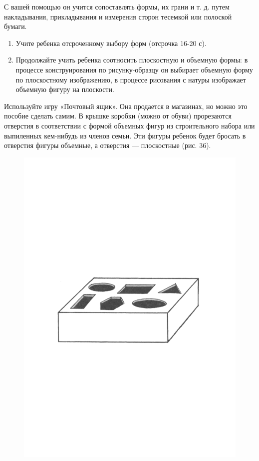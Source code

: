 \documentclass[a5paper]{book}
\begin{document}
С вашей помощью он учится сопоставлять формы, их грани и т. д. путем
накладывания, прикладывания и измерения сторон тесемкой или полоской
бумаги.


\begin{enumerate}
\def\labelenumi{\arabic{enumi}.}
\setcounter{enumi}{2}
\item
  
  Учите ребенка отсроченному выбору форм (отсрочка 16-20 с).
  
\item
  
  Продолжайте учить ребенка соотносить плоскостную и объемную формы: в
  процессе конструирования по рисунку-образцу он выбирает объемную форму
  по плоскостному изображению, в процессе рисования с натуры изображает
  объемную фигуру на плоскости.
  
\end{enumerate}


Используйте игру «Почтовый ящик». Она продается в магазинах, но можно
это пособие сделать самим. В крышке коробки (можно от обуви) прорезаются
отверстия в соответствии с формой объемных фигур из строительного набора
или выпиленных кем-нибудь из членов семьи. Эти фигуры ребенок будет
бросать в отверстия фигуры объемные, а отверстия --- плоскостные (рис.
36).

\begin{figure}
\centering
\includegraphics[width=\linewidth]{media/media/image33.png}
\end{figure}
\end{document}
